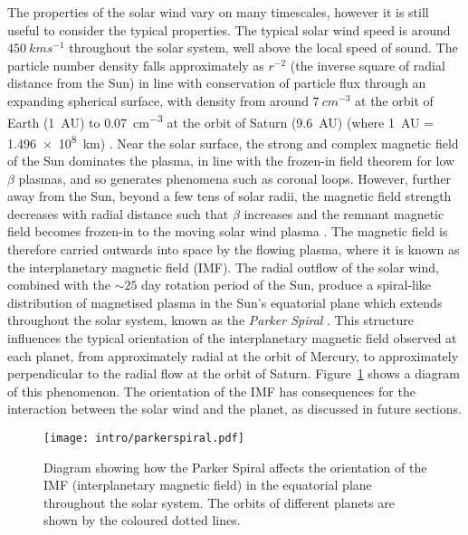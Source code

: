 The properties of the solar wind vary on many timescales, however it is still useful to consider the typical properties. The typical solar wind speed is around $\SI{450}{kms^{-1}}$ throughout the solar system, well above the local speed of sound. The particle number density falls approximately as $r^{-2}$ (the inverse square of radial distance from the Sun) in line with conservation of particle flux through an expanding spherical surface, with density from around $\SI{7}{cm^{-3}}$ at the orbit of Earth (\SI{1}{AU}) to \SI{0.07}{cm^{-3}} at the orbit of Saturn (\SI{9.6}{AU}) (where \SI{1}{AU} = \SI{1.496e8}{km}) \citep{bagenal2014}. Near the solar surface, the strong and complex magnetic field of the Sun dominates the plasma, in line with the frozen-in field theorem for low $\beta$ plasmas, and so generates phenomena such as coronal loops. However, further away from the Sun, beyond a few tens of solar radii, the magnetic field strength decreases with radial distance such that $\beta$ increases and the remnant magnetic field becomes frozen-in to the moving  solar wind plasma \citep{russell2016}. The magnetic field is therefore carried outwards into space by the flowing plasma, where it is known as the interplanetary magnetic field (IMF). The radial outflow of the solar wind, combined with the ${\sim}25$ day rotation period of the Sun, produce a spiral-like distribution of magnetised plasma in the Sun's equatorial plane which extends throughout the solar system, known as the \textit{Parker Spiral} \citep{parker1958}. This structure influences the typical orientation of the interplanetary magnetic field observed at each planet, from approximately radial at the orbit of Mercury, to approximately perpendicular to the radial flow at the orbit of Saturn. Figure~\ref{intro:fig:parkerspiral} shows a diagram of this phenomenon. The orientation of the IMF has consequences for the interaction between the solar wind and the planet, as discussed in future sections.

\begin{figure}
\centering
\noindent\texttt{[image: intro/parkerspiral.pdf]}
\caption[Diagram of the Parker Spiral throughout the solar system.]{Diagram showing how the Parker Spiral affects the orientation of the IMF (interplanetary magnetic field) in the equatorial plane throughout the solar system. The orbits of different planets are shown by the coloured dotted lines.}
\label{intro:fig:parkerspiral}
\end{figure}

